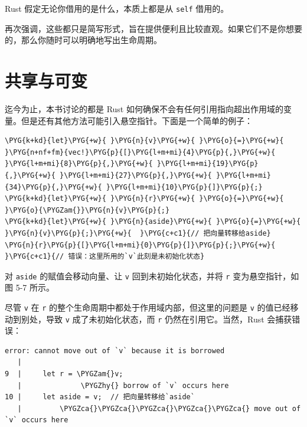 Rust 假定无论你借用的是什么，本质上都是从 \texttt{self} 借用的。

再次强调，这些都只是简写形式，旨在提供便利且比较直观。如果它们不是你想要的，那么你随时可以明确地写出生命周期。

\section{共享与可变}

迄今为止，本书讨论的都是 Rust 如何确保不会有任何引用指向超出作用域的变量。但是还有其他方法可能引入悬空指针。下面是一个简单的例子：

\begin{Verbatim}[commandchars=\\\{\},breaklines=true,breakanywhere=true,fontsize=\codefont,xleftmargin=17bp]
\PYG{k+kd}{let}\PYG{+w}{ }\PYG{n}{v}\PYG{+w}{ }\PYG{o}{=}\PYG{+w}{ }\PYG{n+nf+fm}{vec!}\PYG{p}{[}\PYG{l+m+mi}{4}\PYG{p}{,}\PYG{+w}{ }\PYG{l+m+mi}{8}\PYG{p}{,}\PYG{+w}{ }\PYG{l+m+mi}{19}\PYG{p}{,}\PYG{+w}{ }\PYG{l+m+mi}{27}\PYG{p}{,}\PYG{+w}{ }\PYG{l+m+mi}{34}\PYG{p}{,}\PYG{+w}{ }\PYG{l+m+mi}{10}\PYG{p}{]}\PYG{p}{;}
\PYG{k+kd}{let}\PYG{+w}{ }\PYG{n}{r}\PYG{+w}{ }\PYG{o}{=}\PYG{+w}{ }\PYG{o}{\PYGZam{}}\PYG{n}{v}\PYG{p}{;}
\PYG{k+kd}{let}\PYG{+w}{ }\PYG{n}{aside}\PYG{+w}{ }\PYG{o}{=}\PYG{+w}{ }\PYG{n}{v}\PYG{p}{;}\PYG{+w}{  }\PYG{c+c1}{// 把向量转移给aside}
\PYG{n}{r}\PYG{p}{[}\PYG{l+m+mi}{0}\PYG{p}{]}\PYG{p}{;}\PYG{+w}{           }\PYG{c+c1}{// 错误：这里所用的`v`此刻是未初始化状态}
\end{Verbatim}

对 \texttt{aside} 的赋值会移动向量、让 \texttt{v} 回到未初始化状态，并将 \texttt{r} 变为悬空指针，如图 5-7 所示。


尽管 \texttt{v} 在 \texttt{r} 的整个生命周期中都处于作用域内部，但这里的问题是 \texttt{v} 的值已经移动到别处，导致 \texttt{v} 成了未初始化状态，而 \texttt{r} 仍然在引用它。当然，Rust 会捕获错误：

\begin{Verbatim}[commandchars=\\\{\},breaklines=true,breakanywhere=true,fontsize=\codefont,xleftmargin=17bp]
error: cannot move out of `v` because it is borrowed
   |
9  |     let r = \PYGZam{}v;
   |              \PYGZhy{} borrow of `v` occurs here
10 |     let aside = v;  // 把向量转移给`aside`
   |         \PYGZca{}\PYGZca{}\PYGZca{}\PYGZca{}\PYGZca{} move out of `v` occurs here
\end{Verbatim}

